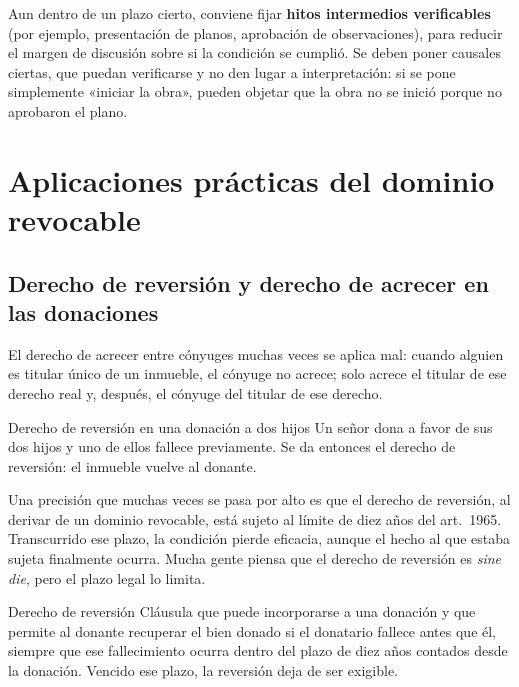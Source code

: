 \documentclass[12pt,oneside]{book}
\begin{document}
\begin{important}
Aun dentro de un plazo cierto, conviene fijar \textbf{hitos intermedios verificables} (por ejemplo, presentación de planos, aprobación de observaciones), para reducir el margen de discusión sobre si la condición se cumplió. Se deben poner causales ciertas, que puedan verificarse y no den lugar a interpretación: si se pone simplemente «iniciar la obra», pueden objetar que la obra no se inició porque no aprobaron el plano.
\end{important}

\section{Aplicaciones prácticas del dominio revocable}
\label{sec:aplicaciones}

\subsection{Derecho de reversión y derecho de acrecer en las donaciones}
\label{sec:reversion}

El derecho de acrecer entre cónyuges muchas veces se aplica mal: cuando alguien es titular único de un inmueble, el cónyuge no acrece; solo acrece el titular de ese derecho real y, después, el cónyuge del titular de ese derecho.

\begin{example}{Derecho de reversión en una donación a dos hijos}
Un señor dona a favor de sus dos hijos y uno de ellos fallece previamente. Se da entonces el derecho de reversión: el inmueble vuelve al donante.

Una precisión que muchas veces se pasa por alto es que el derecho de reversión, al derivar de un dominio revocable, está sujeto al límite de diez años del art.~1965. Transcurrido ese plazo, la condición pierde eficacia, aunque el hecho al que estaba sujeta finalmente ocurra. Mucha gente piensa que el derecho de reversión es \emph{sine die}, pero el plazo legal lo limita.
\end{example}

\begin{definition}{Derecho de reversión}
Cláusula que puede incorporarse a una donación y que permite al donante recuperar el bien donado si el donatario fallece antes que él, siempre que ese fallecimiento ocurra dentro del plazo de diez años contados desde la donación. Vencido ese plazo, la reversión deja de ser exigible.
\end{definition}
\end{document}
